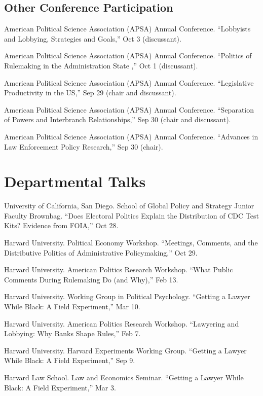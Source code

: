 \documentclass[12pt,letterpaper]{report}
\newcommand{\talk}[4]{\item[#1]{\tab{}#3. \enquote{#2,} #4.}} %
\newcommand{\APSA}{American Political Science Association (APSA) Annual Conference}
\begin{document}
    \subsection*{Other Conference Participation}
    \begin{tablist}
    \talk{2021}{Lobbyists and Lobbying, Strategies and Goals}{\APSA}{Oct 3 (discussant)}    
    \talk{2021}{Politics of Rulemaking in the Administration State  }{\APSA}{Oct 1 (discussant)}    
    \talk{2021}{Legislative Productivity in the US}{\APSA}{Sep 29 (chair and discussant)}
    \talk{2021}{Separation of Powers and Interbranch Relationships}{\APSA}{Sep 30 (chair and discussant)}
    \talk{2021}{Advances in Law Enforcement Policy Research}{\APSA}{Sep 30 (chair)}
    \end{tablist}


    \section*{Departmental Talks}

    \begin{tablist}
    \talk{2020}{Does Electoral Politics Explain the Distribution of CDC Test Kits? Evidence from FOIA}{ University of California, San Diego. School of Global Policy and Strategy Junior Faculty Brownbag}{Oct 28}
    \talk{2018}{Meetings, Comments, and the Distributive Politics of Administrative Policymaking}{Harvard University. Political Economy Workshop}{Oct 29}
	\talk{2018}{What Public Comments During Rulemaking Do (and Why)}{Harvard University. American Politics Research Workshop}{Feb 13}
    \talk{2017}{Getting a Lawyer While Black: A Field Experiment}{Harvard University. Working Group in Political Psychology}{Mar 10}
    \talk{2017}{Lawyering and Lobbying: Why Banks Shape Rules}{Harvard University. American Politics Research Workshop}{Feb 7}
    \talk{2016}{Getting a Lawyer While Black: A Field Experiment}{Harvard University. Harvard Experiments Working Group}{Sep 9}
    \talk{2016}{Getting a Lawyer While Black: A Field Experiment}{Harvard Law School. Law and Economics Seminar}{Mar 3}
    \end{tablist}
    
\end{document}
